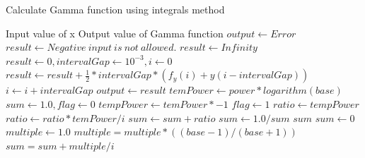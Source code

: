 \documentclass{report}
\begin{document}
\begin{algorithm}
	\caption{Calculate Gamma function using integrals method} 
	\begin{algorithmic}[1]
	\begin{footnotesize}
		\Require Input value of x
		\Ensure Output value of Gamma function
			\State {}
		\EndFunction
		\State
			\State $output \gets Error$
				\State $result \gets Negative \ input \ is \ not \ allowed.$
				\State $result \gets Infinity$
			\Else
			\State $result \gets 0, intervalGap \gets 10^{-3},i \gets 0$
				\State $result \gets result + \frac{1}{2}*intervalGap*\left ( f_y\left ( i \right ) +y\left (  i-intervalGap\right )  \right )$
				\State $i \gets i+intervalGap$
			\EndWhile
			\State $output \gets result$
			\EndIf
			\State {}
		\EndFunction
		\State
		\State $temPower \gets power * logarithm(base)$
		\State $sum \gets 1.0, flag \gets 0$
			\State $tempPower \gets temPower * -1$
			\State $flag \gets 1$
		\EndIf
		\State $ratio \gets tempPower$
			\State $ratio \gets ratio * temPower / i$
			\State $sum \gets sum + ratio$
		\EndFor
			\State $sum \gets 1.0 / sum$
		\EndIf
		\State \Return $sum$
		\EndFunction
		\State
			\State $sum \gets 0$
			\State $multiple \gets 1.0$
				\State $multiple = multiple * ((base-1)/(base+1))$
					\State $sum = sum + multiple/i$
				\EndIf
			\EndFor
			\State {}
		\EndFunction
	\end{footnotesize}
	\end{algorithmic}
\end{algorithm}
\end{document}

